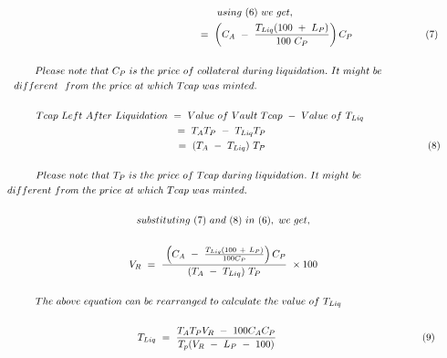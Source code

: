 {\begin{gather}
\ \ \ \ \ \ \ \ \ \ \ \ \ \ \ \ \ \ \ using\ ( 6) \ we\ get, \notag\\
\ \ \ \ \ \ \ \ \ \ \ \ \ \ \ \ \ \ \ \ \ \ \ \ \ \ \ \ \ \ \ \ \ \ \ \ \ \ \ \ \ \ \ \ \ \ \ \ \ \ \ \ \ \ \ \ \ \ =\ \left( C_{A} \ -\ \frac{T_{Liq}( 100\ +\ L_{P})}{100\ C_{P}}\right) C_{P} \ \ \ \ \ \ \ \ \ \ \ \ \ \ \ \ \ \ \ \ \ \ ( 7)\\
 \notag\\
Please\ note\ that\ C_{P} \ is\ the\ price\ of\ collateral\ during\ liquidation.\ It\ might\ be\ \ \ \ \ \ \ \ \  \notag\\
\ \ \ \ different\ \ from\ the\ price\ at\ which\ Tcap\ was\ minted.\ \ \ \ \ \ \ \ \ \ \ \ \ \ \ \ \ \ \ \ \ \ \ \ \ \ \ \ \ \ \ \ \ \ \ \ \ \ \ \ \ \ \ \ \ \ \ \ \ \ \ \ \ \ \ \ \  \notag\\
 \notag\\
Tcap\ Left\ After\ Liquidation\ =\ Value\ of\ Vault\ Tcap\ -\ Value\ of\ T_{Liq} \ \ \ \ \ \ \ \ \ \ \ \ \ \  \notag\\
=\ T_{A} T_{P} \ -\ T_{Liq} T_{P} \  \notag\\
\ \ \ \ \ \ \ \ \ \ \ \ \ \ \ \ \ \ \ \ \ \ \ \ \ \ \ \ \ \ \ \ \ \ \ \ \ \ \ \ \ \ \ \ \ \ \ \ \ \ \ \ =\ ( T_{A} \ -\ T_{Liq}) \ T_{P} \ \ \ \ \ \ \ \ \ \ \ \ \ \ \ \ \ \ \ \ \ \ \ \ \ \ \ \ \ \ \ \ \ \ \ \ \ \ \ \ \ \ \ \ \ \ \ \ \ ( 8)\\
 \notag\\
Please\ note\ that\ T_{P} \ is\ the\ price\ of\ Tcap\ during\ liquidation.\ It\ might\ be\ \ \ \ \ \ \ \ \ \ \ \ \ \ \  \notag\\
\ \ \ \ different\ from\ the\ price\ at\ which\ Tcap\ was\ minted.\ \ \ \ \ \ \ \ \ \ \ \ \ \ \ \ \ \ \ \ \ \ \ \ \ \ \ \ \ \ \ \ \ \ \ \ \ \ \ \ \ \ \ \ \ \ \ \ \ \ \ \ \ \ \ \ \ \ \ \ \ \  \notag\\
 \notag\\
substituting\ ( 7) \ and\ ( 8) \ in\ ( 6) ,\ we\ get, \notag\\
 \notag\\
V_{R} \ =\ \frac{\ \left( C_{A} \ -\ \frac{T_{Liq}( 100\ +\ L_{P})}{100C_{P}}\right) C_{P}}{( T_{A} \ -\ T_{Liq}) \ T_{P}} \ \times 100 \notag\\
 \notag\\
The\ above\ equation\ can\ be\ rearranged\ to\ calculate\ the\ value\ of\ T_{Liq} \ \ \ \ \ \ \ \ \ \ \ \ \ \ \ \ \ \ \ \ \  \notag\\
 \notag\\
\ \ \ \ \ \ \ \ \ \ \ \ \ \ \ \ \ \ \ \ \ \ \ \ \ \ \ \ \ \ \ \ \ \ \ \ \ \ T_{Liq} \ =\ \frac{T_{A} T_{P} V_{R} \ -\ 100C_{A} C_{P}}{T_{p}( V_{R} \ -\ L_{P} \ -\ 100)} \ \ \ \ \ \ \ \ \ \ \ \ \ \ \ \ \ \ \ \ \ \ \ \ \ \ \ \ \ \ \ \ \ \ \ \ \ \ \ \ \ \ \ \ ( 9)\\

\end{gather}}
